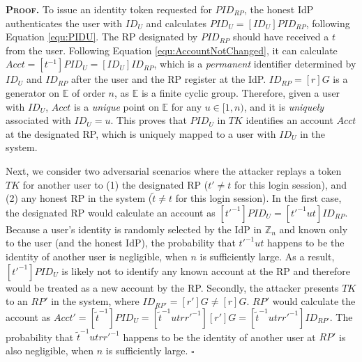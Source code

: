 \noindent\textbf{\textsc{Proof.}}
To issue an identity token requested for $PID_{RP}$, the honest IdP authenticates the user with $ID_U$ and calculates $PID_U = [ID_U]PID_{RP}$, following Equation \ref{equ:PIDU}. The RP designated by $PID_{RP}$ should have received a $t$ from the user. Following Equation \ref{equ:AccountNotChanged}, it can calculate $Acct = [t^{-1}]PID_{U} = [ID_U]ID_{RP}$, which is a \emph{permanent} identifier determined by $ID_U$ and $ID_{RP}$ after the user and the RP register at the IdP. $ID_{RP} = [r]G$ is a generator on $\mathbb{E}$ of order $n$, as $\mathbb{E}$ is a finite cyclic group. Therefore, given a user with $ID_U$, $Acct$ is a \emph{unique} point on $\mathbb{E}$ for any $u \in [1, n)$, and it is \emph{uniquely} associated with $ID_U=u$. 
This proves that $PID_U$ in $TK$ identifies an account $Acct$ at the designated RP, which is uniquely mapped to a user with $ID_U$ in the system.

Next, we consider two adversarial scenarios where the attacker replays a token $TK$ for another user to (1) the designated RP ($t'\neq t$ for this login session), and (2) any honest RP in the system ($\tilde{t}\neq t$ for this login session). In the first case, the designated RP would calculate an account as $[t'^{-1}]PID_U = [t'^{-1}ut]ID_{RP}$.
Because a user's identity is randomly selected by the IdP in $\mathbb{Z}_n$ and known only to the user (and the honest IdP), the probability that $t'^{-1}ut$ happens to be the identity of another user is negligible, when $n$ is sufficiently large. As a result, $[t'^{-1}]PID_U$ is likely not to identify any known account at the RP and therefore would be treated as a new account by the RP. 
Secondly, the attacker presents $TK$ to an $RP'$ in the system, where $ID_{RP'} = [r']G \neq [r]G$. $RP'$ would calculate the account as $Acct' = [\tilde{t}^{-1}]PID_{U} = [\tilde{t}^{-1}utrr'^{-1}][r']G = [\tilde{t}^{-1}utrr'^{-1}]ID_{RP'}$. The probability that $\tilde{t}^{-1}utrr'^{-1}$ happens to be the identity of another user at $RP'$ is also negligible, when $n$ is sufficiently large. 
\hfill $\square$



